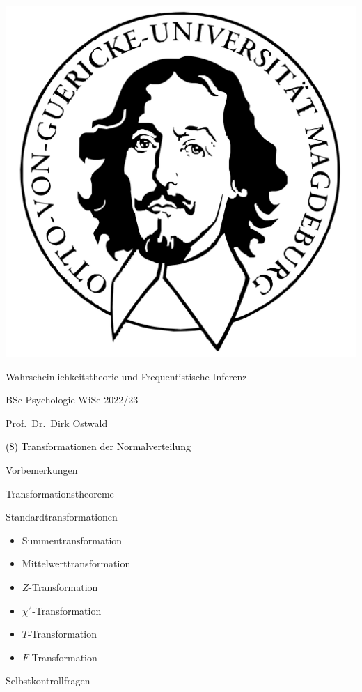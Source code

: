 \documentclass[
  8pt,
  ignorenonframetext,
]{beamer}
\author{}
\date{\vspace{-2.5em}}
\providecommand{\tightlist}{%
  \setlength{\itemsep}{0pt}\setlength{\parskip}{0pt}}
\begin{document}
\begin{frame}[plain]{}
\protect\hypertarget{section}{}
\center

\begin{center}\includegraphics[width=0.2\linewidth]{8_Abbildungen/wtfi_8_otto} \end{center}

\vspace{2mm}

\Large

Wahrscheinlichkeitstheorie und Frequentistische Inferenz \vspace{6mm}

\large

BSc Psychologie WiSe 2022/23

\vspace{6mm}
\normalsize

Prof.~Dr.~Dirk Ostwald
\end{frame}

\begin{frame}[plain]{}
\protect\hypertarget{section-1}{}
\vfill
\center
\huge

\textcolor{black}{(8)  Transformationen der Normalverteilung} \vfill
\end{frame}

\begin{frame}{}
\protect\hypertarget{section-2}{}
\large

Vorbemerkungen

Transformationstheoreme

Standardtransformationen

\begin{itemize}
\tightlist
\item
  \normalsize Summentransformation
\item
  Mittelwerttransformation
\item
  \(Z\)-Transformation
\item
  \(\chi^2\)-Transformation
\item
  \(T\)-Transformation
\item
  \(F\)-Transformation
\end{itemize}

Selbstkontrollfragen
\end{frame}
\end{document}
